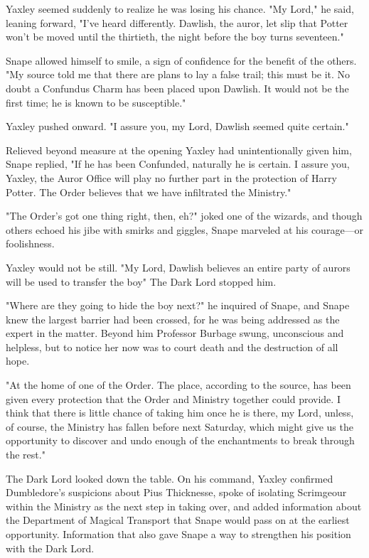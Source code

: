 Yaxley seemed suddenly to realize he was losing his chance. "My Lord," he said, leaning forward, "I've heard differently. Dawlish, the auror, let slip that Potter won't be moved until the thirtieth, the night before the boy turns seventeen."

Snape allowed himself to smile, a sign of confidence for the benefit of the others. "My source told me that there are plans to lay a false trail; this must be it. No doubt a Confundus Charm has been placed upon Dawlish. It would not be the first time; he is known to be susceptible."

Yaxley pushed onward. "I assure you, my Lord, Dawlish seemed quite certain."

Relieved beyond measure at the opening Yaxley had unintentionally given him, Snape replied, "If he has been Confunded, naturally he is certain. I assure you, Yaxley, the Auror Office will play no further part in the protection of Harry Potter. The Order believes that we have infiltrated the Ministry."

"The Order's got one thing right, then, eh?" joked one of the wizards, and though others echoed his jibe with smirks and giggles, Snape marveled at his courage—or foolishness.

Yaxley would not be still. "My Lord, Dawlish believes an entire party of aurors will be used to transfer the boy{\el}" The Dark Lord stopped him.

"Where are they going to hide the boy next?" he inquired of Snape, and Snape knew the largest barrier had been crossed, for he was being addressed as the expert in the matter. Beyond him Professor Burbage swung, unconscious and helpless, but to notice her now was to court death and the destruction of all hope.

"At the home of one of the Order. The place, according to the source, has been given every protection that the Order and Ministry together could provide. I think that there is little chance of taking him once he is there, my Lord, unless, of course, the Ministry has fallen before next Saturday, which might give us the opportunity to discover and undo enough of the enchantments to break through the rest."

The Dark Lord looked down the table. On his command, Yaxley confirmed Dumbledore's suspicions about Pius Thicknesse, spoke of isolating Scrimgeour within the Ministry as the next step in taking over, and added information about the Department of Magical Transport that Snape would pass on at the earliest opportunity. Information that also gave Snape a way to strengthen his position with the Dark Lord.

